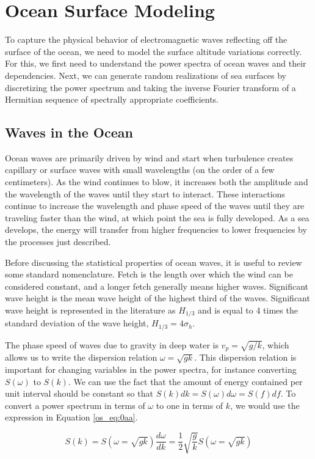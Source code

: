 \chapter{Ocean Surface Modeling}
To capture the physical behavior of electromagnetic waves reflecting off the surface of the ocean, we need to model the surface altitude variations correctly. For this, we first need to understand the power spectra of ocean waves and their dependencies. Next, we can generate random realizations of sea surfaces by discretizing the power spectrum and taking the inverse Fourier transform of a Hermitian sequence of spectrally appropriate coefficients.

\section {Waves in the Ocean}
Ocean waves are primarily driven by wind and start when turbulence creates capillary or surface waves with small wavelengths (on the order of a few centimeters). As the wind continues to blow, it increases both the amplitude and the wavelength of the waves until they start to interact. These interactions continue to increase the wavelength and phase speed of the waves until they are traveling faster than the wind, at which point the sea is fully developed. As a sea develops, the energy will transfer from higher frequencies to lower frequencies by the processes just described.

Before discussing the statistical properties of ocean waves, it is useful to review some standard nomenclature. Fetch is the length over which the wind can be considered constant, and a longer fetch generally means higher waves. Significant wave height is the mean wave height of the highest third of the waves. Significant wave height is represented in the literature as $H_{1/3}$ and is equal to 4 times the standard deviation of the wave height, $H_{1/3} = 4\sigma_h$.

The phase speed of waves due to gravity in deep water is $v_p=\sqrt{g/k}$, which allows us to write the dispersion relation $\omega = \sqrt{gk}$. This dispersion relation is important for changing variables in the power spectra, for instance converting $S(\omega)$ to $S(k)$. We can use the fact that the amount of energy contained per unit interval should be constant so that $S(k)dk = S(\omega)d\omega = S(f)df$. To convert a power spectrum in terms of $\omega$ to one in terms of $k$, we would use the expression in Equation \ref{os_eq:0aa}.

\begin{equation}
  \label{os_eq:0aa}
  S(k) = S(\omega = \sqrt{gk})\frac{d\omega}{dk} = \frac{1}{2}\sqrt{\frac{g}{k}}S(\omega=\sqrt{gk})
  \end{equation}

